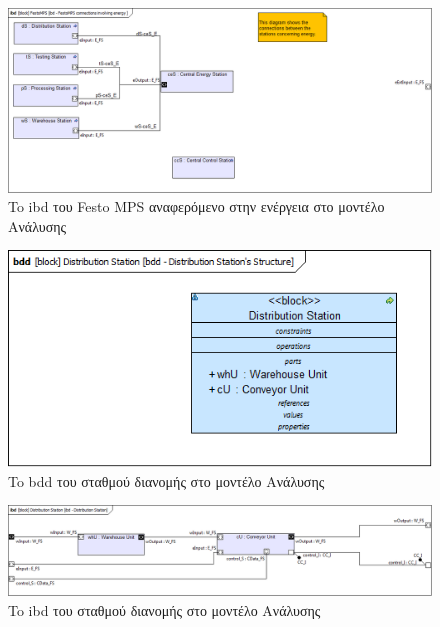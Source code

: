 \documentclass[a4paper,12pt,twoside]{report}
\begin{document}
{\begin{appendices}
			\begin{figure}[hp]
					\centering
					\includegraphics[scale=0.30]{AnalysisModel_ibd-FestoMPSconnectionsinvolvingenergy.png}
					\caption{To ibd του Festo MPS αναφερόμενο στην ενέργεια στο μοντέλο Ανάλυσης}
					\label{φωτ:To ibd του Festo MPS αναφερόμενο στην ενέργεια στο μοντέλο Ανάλυσης}
			\end{figure}
			
			\begin{figure}[hp]
					\centering
					\includegraphics[scale=0.30]{AnalysisModel_bdd-DistributionStationsStructure.png}
					\caption{To bdd του σταθμού διανομής στο μοντέλο Ανάλυσης}
					\label{φωτ:To bdd του σταθμού διανομής στο μοντέλο Ανάλυσης}
			\end{figure}
			
			\begin{figure}[hp]
					\centering
					\includegraphics[scale=0.30]{AnalysisModel_ibd-DistributionStation.png}
					\caption{To ibd του σταθμού διανομής στο μοντέλο Ανάλυσης}
					\label{φωτ:To ibd του σταθμού διανομής στο μοντέλο Ανάλυσης}
			\end{figure}
			

\end{appendices}}
\end{document}
